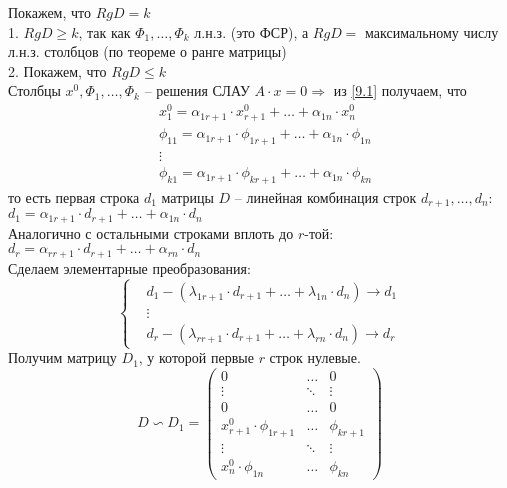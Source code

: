 \documentclass[a4paper,12pt]{article}
\begin{document}
    Покажем, что $RgD=k$\\
    1. $RgD\geq k$, так как $\Phi_1, \ldots, \Phi_k$ л.н.з. (это ФСР), а $RgD=$ максимальному числу л.н.з. столбцов (по теореме о ранге матрицы)\\
    2. Покажем, что $RgD\leq k$\\
    Столбцы $x^0, \Phi_1, \ldots, \Phi_k$ -- решения СЛАУ $A\cdot x=0\Rightarrow$ из \eqref{9.1} получаем, что
    \begin{align*}
        &x_1^0=\alpha_{1r+1}\cdot x_{r+1}^0+\ldots+\alpha_{1n}\cdot x_n^0\\
        &\phi_{11}=\alpha_{1r+1}\cdot \phi_{1r+1}+\ldots+\alpha_{1n}\cdot \phi_{1n}\\
        &\vdots\\
        &\phi_{k1}=\alpha_{1r+1}\cdot \phi_{kr+1}+\ldots+\alpha_{1n}\cdot \phi_{kn}
    \end{align*}
    то есть первая строка $d_1$ матрицы $D$ -- линейная комбинация строк $d_{r+1}, \ldots, d_n$:\\
    $d_1=\alpha_{1r+1}\cdot d_{r+1}+\ldots+\alpha_{1n}\cdot d_n$\\
    Аналогично с остальными строками вплоть до $r$-той:\\
    $d_r=\alpha_{rr+1}\cdot d_{r+1}+\ldots+\alpha_{rn}\cdot d_n$\\
    Сделаем элементарные преобразования:
    \[\left\{
    \begin{aligned}
        &d_1-(\lambda_{1r+1}\cdot d_{r+1}+\ldots+\lambda_{1n}\cdot d_n)\rightarrow d_1\\
        &\vdots\\
        &d_r-(\lambda_{rr+1}\cdot d_{r+1}+\ldots+\lambda_{rn}\cdot d_n)\rightarrow d_r
    \end{aligned}\right.
    \]
    Получим матрицу $D_1$, у которой первые $r$ строк нулевые.
    \[
        D\backsim D_1=\begin{pmatrix}
                          0                         & \ldots & 0           \\
                          \vdots                    & \ddots & \vdots      \\
                          0                         & \ldots & 0           \\
                          x_{r+1}^0\cdot\phi_{1r+1} & \ldots & \phi_{kr+1} \\
                          \vdots                    & \ddots & \vdots      \\
                          x_n^0\cdot\phi_{1n}       & \ldots & \phi_{kn}
        \end{pmatrix}
    \]
\end{document}
